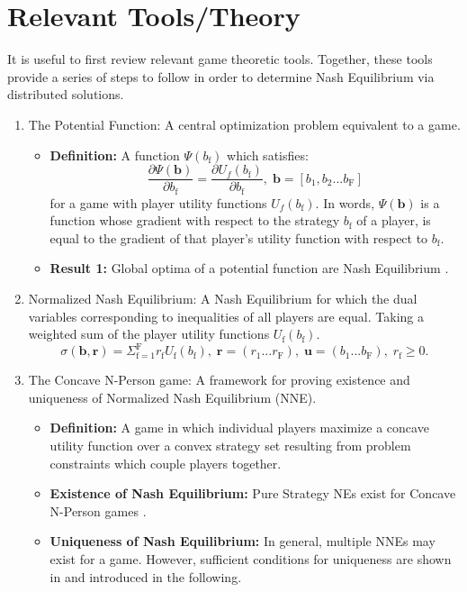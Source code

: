 \documentclass[12pt,a4paper]{report}
\begin{document}
\section{Relevant Tools/Theory}\label{tools}
It is useful to first review relevant game theoretic tools. Together, these tools provide a series of steps to follow in order to determine Nash Equilibrium via distributed solutions. 

\begin{enumerate}
\item The Potential Function: A central optimization problem equivalent to a game.
\begin{itemize}
\item
\textbf{Definition:}  A function
$ \Psi(b_{\text{f}})$ which satisfies:
\begin{equation}\label{potential_game_condition}
\frac{\partial \Psi(\mathbf{b})}{\partial b_{\text{f}}}
 =
 \frac{\partial U_f(b_{\text{f}})}{\partial b_{\text{f}}},
 \;\textbf{b}=[b_{1}, b_2... b_{\text{F}}]
\end{equation} 
for a game with player utility functions $U_f(b_{\text{f}})$.
In words, $ \Psi(\mathbf{b})$ is a function whose gradient with respect to the strategy $b_{\text{f}}$ of a player, is equal to the gradient of that player's utility function with respect to $b_{\text{f}}$.
\item \textbf{Result 1:} Global optima of a potential function are Nash Equilibrium \cite{monderer1996potential}.

\end{itemize}

\item Normalized Nash Equilibrium: A Nash Equilibrium for which the dual variables corresponding to inequalities of all players are equal.
Taking a weighted sum of the player utility functions $U_{\mathrm{f}}(b_{\text{f}})$.
\begin{equation*}
\sigma(\mathbf{b},\mathbf{r})  = \Sigma_{\mathrm{f=1}}^{\mathrm{F}} r_{\mathrm{f}}U_{\mathrm{f}}(b_{\text{f}}),\; \mathbf{r}=(r_{\text{1}}... r_{\text{F}})
,\; \mathbf{u}=(b_{\text{1}}... b_{\text{F}})
, \; 
r_{\mathrm{f}} \geq 0.
\end{equation*}



\item The Concave N-Person game: A framework for proving existence and uniqueness of Normalized Nash Equilibrium (NNE).

\begin{itemize}
\item
\textbf{Definition:} A game in which individual players maximize a concave utility function over a convex strategy set resulting from problem constraints which couple players together.
\item 
\textbf{Existence of Nash Equilibrium:} Pure Strategy NEs exist for Concave N-Person games \cite[Thm1]{rosen1964existence}. 
\item
\textbf{Uniqueness of Nash Equilibrium:} In general, multiple NNEs may exist for a game. However, sufficient conditions for uniqueness are shown in \cite[Thm4]{rosen1964existence} and introduced in the following. 


\end{itemize}
\end{enumerate}
\end{document}
